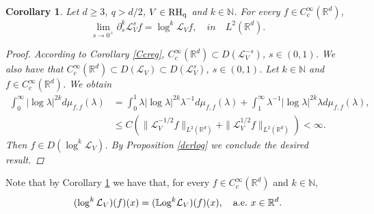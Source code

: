 \documentclass[10pt, a4paper, reqno]{amsart}
\newtheorem{cor}[thm]{Corollary}
\theoremstyle{definition}
\theoremstyle{remark}
\numberwithin{equation}{section}
\begin{document}
\begin{cor}\label{Ccreglog}
Let $d\ge 3$, $q>d/2$, $V\in \rm{RH}_q$ and $k\in \mathbb{N}$. For every $f\in C_c^\infty(\mathbb{R}^d)$,
\[
\lim_{s\to 0^+}\partial_s^k\mathcal{L}_V^sf=\log^k \mathcal{L}_V f, \quad in\quad L^2(\mathbb{R}^d).
\]
\begin{proof}
According to Corollary \ref{Ccreg}, $C_c^\infty(\mathbb{R}^d)\subset D(\mathcal{L}_V^{-s})$, $s\in (0,1)$. We also have that $C_c^\infty(\mathbb{R}^d)\subset D(\mathcal{L}_V)\subset D(\mathcal{L}_V^s)$, $s\in (0,1)$. Let $k\in \mathbb{N}$ and $f\in C_c^\infty(\mathbb{R}^d)$. We obtain
\begin{align*}
\int_0^\infty |\log\lambda|^{2k}d\mu_{f,f}(\lambda)&=\int_0^1\lambda|\log\lambda|^{2k}\lambda^{-1}d\mu_{f,f}(\lambda)+\int_1^\infty\lambda^{-1}|\log\lambda |^{2k}\lambda d\mu_{f,f}(\lambda),\\
&\le C\left(\|\mathcal{L}_V^{-1/2}f\|_{L^2(\mathbb{R}^d)}+\|\mathcal{L}_V^{1/2}f\|_{L^2(\mathbb{R}^d)}\right)<\infty.
\end{align*}
Then $f\in D(\log^k\mathcal{L}_V)$. By Proposition \ref{derlog} we conclude the desired result.
\end{proof}
\end{cor}

Note that by Corollary \ref{Ccreglog} we have that, for every $f\in C_c^\infty(\mathbb{R}^d)$ and $k\in \mathbb{N}$, 
\[
(\log^k\mathcal{L}_V)(f)(x)=(\mathbb{L}\textup{og}^k\mathcal L_V)(f)(x),\quad\mbox{a.e.}\,\,x\in \mathbb{R}^d.
\]
\end{document}
